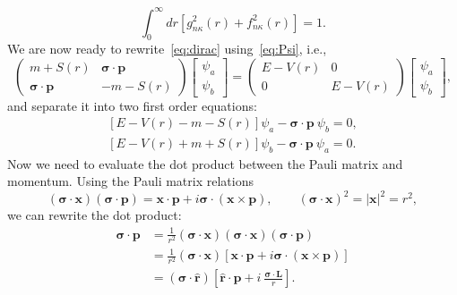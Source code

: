 \begin{equation}
\int _0^{\infty} dr[g_{n\kappa}^2(r)+f_{n\kappa}^2(r)]=1.
\end{equation}
We are now ready to rewrite~\eqref{eq:dirac} using~\eqref{eq:Psi}, i.e.,
\begin{equation}
\begin{pmatrix}
m+S(r) & \boldsymbol{\sigma} \cdot \mathbf{p} \\
\boldsymbol{\sigma} \cdot \mathbf{p} & -m-S(r)
\end{pmatrix}
\begin{bmatrix}
\psi _a \\
\psi _b
\end{bmatrix}
=
\begin{pmatrix}
E-V(r) & 0 \\
0 & E-V(r)
\end{pmatrix}
\begin{bmatrix}
\psi _a \\
\psi _b
\end{bmatrix},
\end{equation}
and separate it into two first order equations:
\begin{equation}\label{eq:dirac1}
\begin{gathered}
\left[ E-V(r)-m-S(r) \right]\psi _a - \boldsymbol{\sigma} \cdot \mathbf{p}\ \psi _b = 0, 
\\
\left[ E-V(r)+m+S(r)\right]\psi _b - \boldsymbol{\sigma} \cdot \mathbf{p}\ \psi _a = 0.
\end{gathered}
\end{equation}
Now we need to evaluate the dot product between the Pauli matrix and momentum. Using the Pauli matrix relations 
\begin{equation}
(\boldsymbol{\sigma}\cdot \mathbf{x})(\boldsymbol{\sigma}\cdot \mathbf{p})= \mathbf{x\cdot p} + i \boldsymbol{\sigma}\cdot (\mathbf{x}\times\mathbf{p}),\qquad 
(\boldsymbol{\sigma}\cdot \mathbf{x})^2=|\mathbf{x}|^2=r^2,
\end{equation}
we can rewrite the dot product:
\begin{align}
\boldsymbol{\sigma}\cdot\mathbf{p} &= \frac{1}{r^2}(\boldsymbol{\sigma}\cdot \mathbf{x})(\boldsymbol{\sigma}\cdot \mathbf{x})(\boldsymbol{\sigma}\cdot \mathbf{p}) \nonumber 
\\
&= \frac{1}{r^2}(\boldsymbol{\sigma}\cdot \mathbf{x}) \left[ \mathbf{x\cdot p} + i \boldsymbol{\sigma}\cdot (\mathbf{x}\times\mathbf{p}) \right] \nonumber 
\\
&= (\boldsymbol{\sigma}\cdot\mathbf{\hat{r}}) \left[ \mathbf{\hat{r}\cdot p} + i\ \frac{\boldsymbol{\sigma}\cdot\mathbf{L}}{r} \right].
\end{align}
